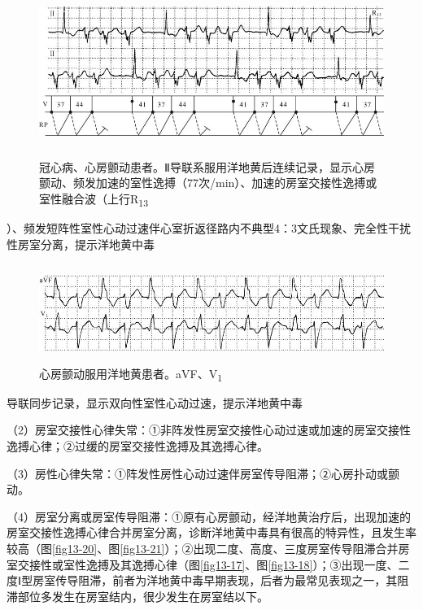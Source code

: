 \begin{figure}[!htbp]
 \centering
 \includegraphics[width=5.71875in,height=2.15625in]{./images/Image00736.jpg}
 \captionsetup{justification=centering}
 \caption{冠心病、心房颤动患者。Ⅱ导联系服用洋地黄后连续记录，显示心房颤动、频发加速的室性逸搏（77次/min）、加速的房室交接性逸搏或室性融合波（上行R\textsubscript{13}}
 \label{fig46-1}
  \end{figure} 
）、频发短阵性室性心动过速伴心室折返径路内不典型4：3文氏现象、完全性干扰性房室分离，提示洋地黄中毒

\begin{figure}[!htbp]
 \centering
 \includegraphics[width=5.6875in,height=1.26042in]{./images/Image00737.jpg}
 \captionsetup{justification=centering}
 \caption{心房颤动服用洋地黄患者。aVF、V\textsubscript{1}}
 \label{fig46-2}
  \end{figure} 
导联同步记录，显示双向性室性心动过速，提示洋地黄中毒

（2）房室交接性心律失常：①非阵发性房室交接性心动过速或加速的房室交接性逸搏心律；②过缓的房室交接性逸搏及其逸搏心律。

（3）房性心律失常：①阵发性房性心动过速伴房室传导阻滞；②心房扑动或颤动。

（4）房室分离或房室传导阻滞：①原有心房颤动，经洋地黄治疗后，出现加速的房室交接性逸搏心律合并房室分离，诊断洋地黄中毒具有很高的特异性，且发生率较高（图\ref{fig13-20}、图\ref{fig13-21}）；②出现二度、高度、三度房室传导阻滞合并房室交接性或室性逸搏及其逸搏心律（图\ref{fig13-17}、图\ref{fig13-18}）；③出现一度、二度Ⅰ型房室传导阻滞，前者为洋地黄中毒早期表现，后者为最常见表现之一，其阻滞部位多发生在房室结内，很少发生在房室结以下。


